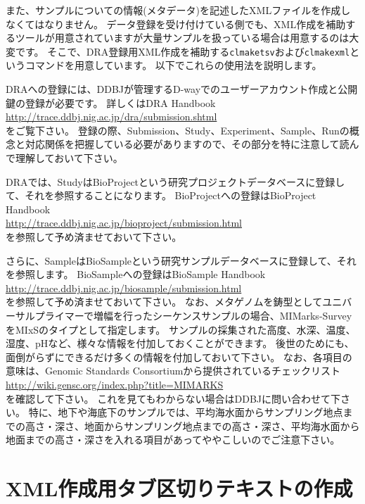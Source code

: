\documentclass[titlepage,10pt,a4paper,english]{jsbook}
\begin{document}
また、サンプルについての情報(メタデータ)を記述したXMLファイルを作成しなくてはなりません。
データ登録を受け付けている側でも、XML作成を補助するツールが用意されていますが大量サンプルを扱っている場合は用意するのは大変です。
そこで、DRA登録用XML作成を補助する\texttt{clmaketsv}および\texttt{clmakexml}というコマンドを用意しています。
以下でこれらの使用法を説明します。

DRAへの登録には、DDBJが管理するD-wayでのユーザーアカウント作成と公開鍵の登録が必要です。
詳しくはDRA Handbook\\
\href{http://trace.ddbj.nig.ac.jp/dra/submission.shtml}{http://trace.ddbj.nig.ac.jp/dra/submission.shtml}\\
をご覧下さい。
登録の際、Submission、Study、Experiment、Sample、Runの概念と対応関係を把握している必要がありますので、その部分を特に注意して読んで理解しておいて下さい。

DRAでは、StudyはBioProjectという研究プロジェクトデータベースに登録して、それを参照することになります。
BioProjectへの登録はBioProject Handbook\\
\href{http://trace.ddbj.nig.ac.jp/bioproject/submission.html}{http://trace.ddbj.nig.ac.jp/bioproject/submission.html}\\
を参照して予め済ませておいて下さい。

さらに、SampleはBioSampleという研究サンプルデータベースに登録して、それを参照します。
BioSampleへの登録はBioSample Handbook\\
\href{http://trace.ddbj.nig.ac.jp/biosample/submission.html}{http://trace.ddbj.nig.ac.jp/biosample/submission.html}\\
を参照して予め済ませておいて下さい。
なお、メタゲノムを鋳型としてユニバーサルプライマーで増幅を行ったシーケンスサンプルの場合、MIMarks-SurveyをMIxSのタイプとして指定します。
サンプルの採集された高度、水深、温度、湿度、pHなど、様々な情報を付加しておくことができます。
後世のためにも、面倒がらずにできるだけ多くの情報を付加しておいて下さい。
なお、各項目の意味は、Genomic Standards Consortiumから提供されているチェックリスト\\
\href{http://wiki.gensc.org/index.php?title=MIMARKS}{http://wiki.gensc.org/index.php?title=MIMARKS}\\
を確認して下さい。
これを見てもわからない場合はDDBJに問い合わせて下さい。
特に、地下や海底下のサンプルでは、平均海水面からサンプリング地点までの高さ・深さ、地面からサンプリング地点までの高さ・深さ、平均海水面から地面までの高さ・深さを入れる項目があってややこしいのでご注意下さい。

\section{XML作成用タブ区切りテキストの作成}
\end{document}
